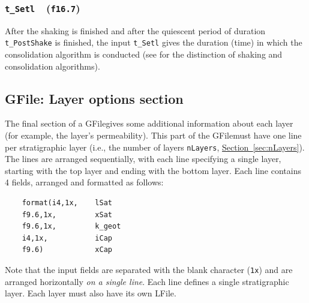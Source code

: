 \documentclass[letterpaper,11pt]{article}
\newcommand{\Var}[2]{\texttt{#1}\ \  (\texttt{#2})}
\newcommand{\GFile}{\textsf{GFile}}
\newcommand{\LFile}{\textsf{LFile}}
\begin{document}
\subsubsection[\texttt{t\_Setl}]{\Var{t\_Setl}{f16.7}}
After the shaking is finished and after the quiescent
period of duration \texttt{t\_PostShake} is finished,
the input \texttt{t\_Setl} gives the duration (time) in
which the consolidation algorithm is conducted
(see \citep{Kuhn:2021a} for the distinction of shaking
and consolidation algorithms).
%
%
\subsection{\GFile: Layer options section}\label{sec:GFileLayer}
The final section of a \GFile gives some additional
information about each layer (for example, the layer's
permeability).
This part of the \GFile must have one line per stratigraphic
layer (i.e., the number of layers \texttt{nLayers},
\hyperref[sec:nLayers]{Section~\ref*{sec:nLayers}}).
The lines are arranged sequentially, with each
line specifying a single layer,
starting with the top layer and ending with the bottom layer.
Each line contains 4 fields, arranged and formatted as follows:\\[-2ex]
%
\begin{verbatim}
	format(i4,1x,    lSat
	f9.6,1x,         xSat
	f9.6,1x,         k_geot
	i4,1x,           iCap
	f9.6)            xCap
\end{verbatim}
\rule{0ex}{3ex}%
Note that the input fields are separated with the blank character
(\texttt{1x}) and are arranged horizontally \emph{on a single line}.
Each line defines a single stratigraphic layer.
Each layer must also have its own \LFile.
%
\end{document}
